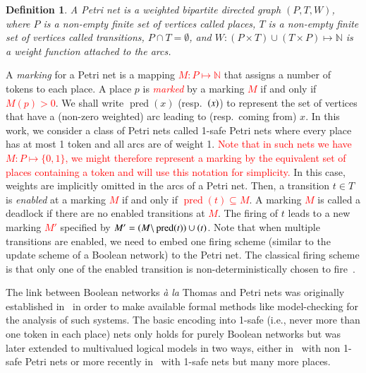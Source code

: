 \documentclass[preprint,12pt]{elsarticle}
\newtheorem{definition}{Definition}[section]
\newcommand{\change}[1]{\textcolor{red}{#1}}
\DeclareMathOperator{\pred}{pred}
\let\succ\relax
\DeclareMathOperator{\succ}{succ}
\begin{document}
\begin{definition}

  A \emph{Petri net} is a weighted bipartite directed graph \((P, T, W)\),
  where \(P\) is a non-empty finite set of vertices called \emph{places},
  \(T\) is a non-empty finite set of vertices called \emph{transitions},
  \(P \cap T = \emptyset\),
  and \(W : (P \times T) \cup (T \times P) \mapsto \mathbb{N} \) is a weight function attached to the arcs.

\end{definition}
A \emph{marking} for a Petri net is a mapping \change{\(M : P \mapsto \mathbb{N}\)} that assigns a number of tokens to each place.
A place \(p\) is \change{\emph{marked}} by a marking \change{\(M\)} if and only if \change{\(M(p) > 0\)}.
We shall write \(\pred(x)\) (resp.\ \(\succ(x)\)) to represent the set of vertices that have a (non-zero weighted) arc leading to (resp.\ coming from) \(x\).
In this work, we consider a class of Petri nets called 1-safe Petri nets where every place has at most 1 token and all arcs are of weight 1.
\change{Note that in such nets we have \change{\(M : P \mapsto \{0,1\}\)}, we might therefore represent a marking by the equivalent set of places containing a token and will use this notation for simplicity.}
In this case, weights are implicitly omitted in the arcs of a Petri net.
Then, a transition \(t \in T\) is \emph{enabled} at a marking \change{\(M\)} if and only if \change{\(\pred(t) \subseteq M\)}.
A marking \change{\(M\)} is called a deadlock if there are no enabled transitions at \change{\(M\)}.
The firing of \(t\) leads to a new marking \change{\(M'\)} specified by \change{\(M' = (M \backslash \pred(t)) \cup \succ(t)\)}.
Note that when multiple transitions are enabled, we need to embed one firing scheme (similar to the update scheme of a Boolean network) to the Petri net.
The classical firing scheme is that only one of the enabled transition is non-deterministically chosen to fire~\cite{Murata1989}.

The link between Boolean networks \emph{à la} Thomas and Petri nets was originally established in~\cite{chaouiya2004qualitative} in order to make available formal methods like model-checking for the analysis of such systems.
The basic encoding into 1-safe (i.e., never more than one token in each place) nets only holds for purely Boolean networks but was later extended to multivalued logical models in two ways, either in~\cite{chaouiya2011petri} with non 1-safe Petri nets or more recently in~\cite{chatain2014characterization} with 1-safe nets but many more places.
\end{document}
